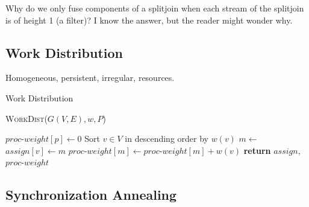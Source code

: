 Why do we only fuse components of a splitjoin when each stream of the
splitjoin is of height 1 (a filter)?  I know the answer, but the
reader might wonder why.
 

\subsection{Work Distribution}
Homogeneous, persistent, irregular, resources.

\begin{algorithm}
\caption{Work Distribution}\label{alg:work_dist}
\textsc{WorkDist}($G(V,E), w, P$)
\begin{algorithmic}[1]
	\State $proc$-$weight[p] \gets 0$  %
\EndFor
\State Sort $v \in V$ in descending order by $w(v)$
        \State $m \gets $ 
	\State $assign[v] \gets m$ %
	\State $proc$-$weight[m] \gets proc$-$weight[m] + w(v)$ %
\EndFor
\State \textbf{return} $assign$, $proc$-$weight$ 
\end{algorithmic}
\end{algorithm}



\subsection{Synchronization Annealing}